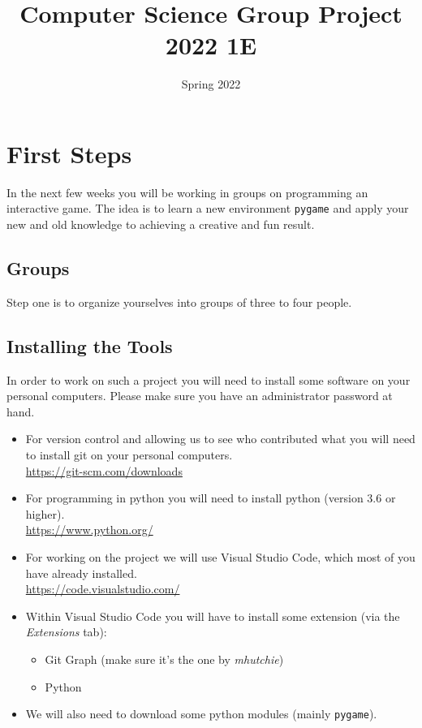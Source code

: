 \documentclass[11pt,a4paper]{report}
\title{Computer Science Group Project 2022 1E}
\date{Spring 2022}
\begin{document}
\maketitle

\newpage
\section{First Steps}
In the next few weeks you will be working in groups on programming an interactive game. The idea is to learn a new environment \verb|pygame| and apply your new and old knowledge to achieving a creative and fun result.
\subsection{Groups}
Step one is to organize yourselves into groups of three to four people. 
\subsection{Installing the Tools}
In order to work on such a project you will need to install some software on your personal computers. Please make sure you have an administrator password at hand. 
\begin{itemize}
\item For version control and allowing us to see who contributed what you will need to install git on your personal computers. \\
\url{https://git-scm.com/downloads}
\item For programming in python you will need to install python (version 3.6 or higher). \\
\url{https://www.python.org/}
\item For working on the project we will use Visual Studio Code, which most of you have already installed.\\
\url{https://code.visualstudio.com/}
\item Within Visual Studio Code you will have to install some extension (via the \emph{Extensions} tab):
\begin{itemize}
\item Git Graph (make sure it's the one by \emph{mhutchie})
\item Python
\end{itemize}
\item We will also need to download some python modules (mainly \verb|pygame|).

\end{itemize}
\end{document}
